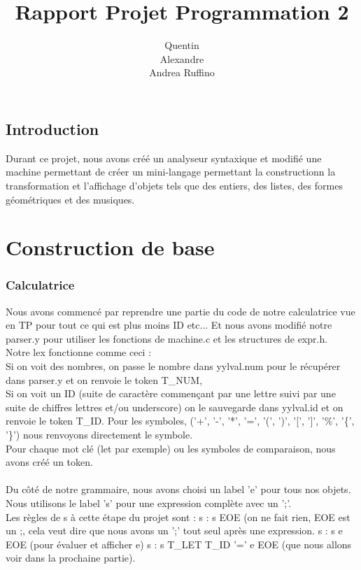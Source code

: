 \documentclass{report}
\title{\textbf{Rapport Projet Programmation 2}}
\author{
	\bsc {Menini} Quentin\\
	\bsc {Brebant} Alexandre\\
	\bsc {Randriamalazavola} Andrea Ruffino}
\begin{document}
\maketitle

\tableofcontents

\chapter*{Introduction}

Durant ce projet, nous avons créé un analyseur syntaxique et modifié une machine permettant de créer un mini-langage permettant la constructionn la transformation et l'affichage d'objets tels que des entiers, des listes, des formes géométriques et des musiques.

\part{Construction de base}

\section{Calculatrice}

Nous avons commencé par reprendre une partie du code de notre calculatrice vue en TP pour tout ce qui est plus moins ID etc... Et nous avons modifié notre parser.y pour utiliser les fonctions de machine.c et les structures de expr.h.\\
Notre lex fonctionne comme ceci :\\
Si on voit des nombres, on passe le nombre dans yylval.num pour le récupérer dans parser.y et on renvoie le token T\_NUM,\\
Si on voit un ID (suite de caractère commençant par une lettre suivi par une suite de chiffres lettres et/ou underscore) on le sauvegarde dans yylval.id et on renvoie le token T\_ID.
Pour les symboles, ('+', '-', '*', '=', '(', ')', '[', ']', '\%', '\{', '\}') nous renvoyons directement le symbole.\\
Pour chaque mot clé (let par exemple) ou les symboles de comparaison, nous avons créé un token.\\
\\
Du côté de notre grammaire, nous avons choisi un label 'e' pour tous nos objets.
Nous utilisons le label 's' pour une expression complète avec un ';'.\\
Les règles de s à cette étape du projet sont :
s : s EOE (on ne fait rien, EOE est un ;, cela veut dire que nous avons un ';' tout seul après une expression.
s : s e EOE (pour évaluer et afficher e)
s : s T\_LET T\_ID '=' e EOE (que nous allons voir dans la prochaine partie).
\end{document}

